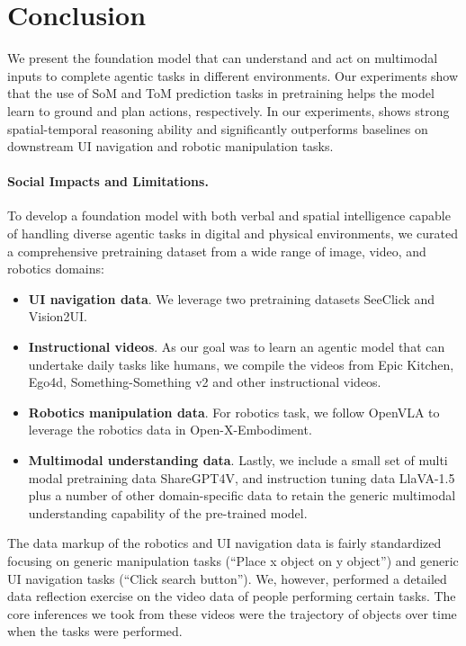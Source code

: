 \section{Conclusion}
We present the \magma foundation model that can understand and act on multimodal inputs to complete agentic tasks in different environments. 
Our experiments show that the use of SoM and ToM prediction tasks in pretraining helps the model learn to ground and plan actions, respectively. In our experiments, \magma shows strong spatial-temporal reasoning ability and significantly outperforms baselines on downstream UI navigation and robotic manipulation tasks.

\paragraph{Social Impacts and Limitations.}

To develop a foundation model with both verbal and spatial intelligence capable of handling diverse agentic tasks in digital and physical environments, we curated a comprehensive pretraining dataset from a wide range of image, video, and robotics domains: 
\begin{itemize}
    \item \textbf{UI navigation data}. We leverage two pretraining datasets SeeClick and Vision2UI.
    \item \textbf{Instructional videos}. As our goal was to learn an agentic model that can undertake daily tasks like humans, we compile the videos from Epic Kitchen, Ego4d, Something-Something v2 and other instructional videos.

    \item \textbf{Robotics manipulation data}. For robotics task, we follow OpenVLA to leverage the robotics data in Open-X-Embodiment.
    \item \textbf{Multimodal understanding data}. Lastly, we include a small set of multi modal pretraining data ShareGPT4V, and instruction tuning data LlaVA-1.5 plus a number of other domain-specific data to retain the generic multimodal understanding capability of the pre-trained model. 
\end{itemize}
 
The data markup of the robotics and UI navigation data is fairly standardized focusing on generic manipulation tasks (“Place x object on y object”) and generic UI navigation tasks (“Click search button”). We, however, performed a detailed data reflection exercise on the video data of people performing certain tasks. The core inferences we took from these videos were the trajectory of objects over time when the tasks were performed.  

